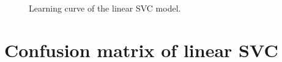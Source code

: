 \begin{figure}[H]
    \centering
    \captionsetup{width=0.7\linewidth}
    \captionsetup{justification=centering}
    \caption{Learning curve of the linear SVC model.}
\end{figure}


\section*{Confusion matrix of linear SVC}

